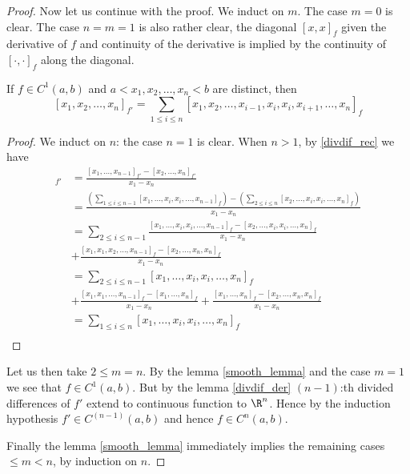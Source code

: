 \begin{proof}
	Now let us continue with the proof. We induct on $m$. The case $m = 0$ is clear. The case $n = m = 1$ is also rather clear, the diagonal $[x, x]_{f}$ given the derivative of $f$ and continuity of the derivative is implied by the continuity of $[\cdot, \cdot]_{f}$ along the diagonal.

	\begin{lem}\label{divdif_der}
		If $f \in C^{1}(a, b)$ and $a < x_{1}, x_{2}, \ldots, x_{n} < b$ are distinct, then 
		\[
			[x_{1}, x_{2}, \ldots, x_{n}]_{f'} = \sum_{1 \leq i \leq n} [x_{1}, x_{2}, \ldots, x_{i - 1}, x_{i}, x_{i}, x_{i + 1}, \ldots, x_{n}]_{f}
		\]
	\end{lem}
	\begin{proof}
		We induct on $n$: the case $n = 1$ is clear. When $n > 1$, by \ref{divdif_rec} we have
		\begin{align*}
			[x_{1}, x_{2}, \ldots, x_{n}]_{f'} &= \frac{[x_{1}, \ldots, x_{n - 1}]_{f'} - [x_{2}, \ldots, x_{n}]_{f'}}{x_{1} - x_{n}} \\
			&= \frac{\left(\sum_{1 \leq i \leq n - 1} [x_{1}, \ldots, x_{i}, x_{i}, \ldots, x_{n - 1}]_{f}\right) - \left(\sum_{2 \leq i \leq n} [x_{2}, \ldots, x_{i}, x_{i}, \ldots, x_{n}]_{f}\right)}{x_{1} - x_{n}} \\
			&= \sum_{2 \leq i \leq n - 1} \frac{[x_{1}, \ldots, x_{i}, x_{i}, \ldots, x_{n - 1}]_{f} - [x_{2}, \ldots, x_{i}, x_{i}, \ldots, x_{n}]_{f}}{x_{1} - x_{n}} \\
			&+ \frac{[x_{1}, x_{1}, x_{2}, \ldots, x_{n - 1}]_{f} - [x_{2}, \ldots, x_{n}, x_{n}]_{f}}{x_{1} - x_{n}} \\
			&= \sum_{2 \leq i \leq n - 1}  [x_{1}, \ldots, x_{i}, x_{i}, \ldots, x_{n}]_{f} \\
			&+ \frac{[x_{1}, x_{1}, \ldots, x_{n - 1}]_{f} - [x_{1}, \ldots, x_{n} ]_{f}}{x_{1} - x_{n}} + \frac{[x_{1}, \ldots, x_{n}]_{f} - [x_{2}, \ldots, x_{n}, x_{n} ]_{f}}{x_{1} - x_{n}} \\
			&= \sum_{1 \leq i \leq n}  [x_{1}, \ldots, x_{i}, x_{i}, \ldots, x_{n}]_{f} \\
		\end{align*}
	\end{proof}

	Let us then take $2 \leq m = n$. By the lemma \ref{smooth_lemma} and the case $m = 1$ we see that $f \in C^{1}(a, b)$. But by the lemma \ref{divdif_der} $(n - 1)$:th divided differences of $f'$ extend to continuous function to $\R^{n}$. Hence by the induction hypothesis $f' \in C^{(n - 1)}(a, b)$ and hence $f \in C^{n}(a, b)$.

	Finally the lemma \ref{smooth_lemma} immediately implies the remaining cases $\leq m < n$, by induction on $n$.
\end{proof}

